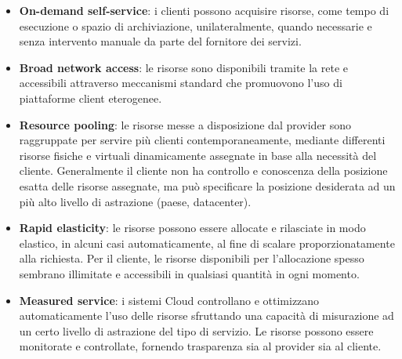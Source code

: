 \documentclass[a4paper]{article}
\begin{document}
\begin{itemize}
    \item{\textbf{On-demand self-service}}: i clienti possono acquisire risorse, come tempo di esecuzione o spazio di archiviazione, unilateralmente, quando necessarie e senza intervento manuale da parte del fornitore dei servizi.
    
    \item{\textbf{Broad network access}}: le risorse sono disponibili tramite la rete e accessibili attraverso meccanismi standard che promuovono l'uso di piattaforme client eterogenee.
    
    \item{\textbf{Resource pooling}}: le risorse messe a disposizione dal provider sono raggruppate per servire più clienti contemporaneamente, mediante differenti risorse fisiche e virtuali dinamicamente assegnate in base alla necessità del cliente. Generalmente il cliente non ha controllo e conoscenza della posizione esatta delle risorse assegnate, ma può specificare la posizione desiderata ad un più alto livello di astrazione (paese, datacenter).
    
    \item{\textbf{Rapid elasticity}}: le risorse possono essere allocate e rilasciate in modo elastico, in alcuni casi automaticamente, al fine di scalare proporzionatamente alla richiesta. Per il cliente, le risorse disponibili per l'allocazione spesso sembrano illimitate e accessibili in qualsiasi quantità in ogni momento.
    
    \item{\textbf{Measured service}}: i sistemi Cloud controllano e ottimizzano automaticamente l'uso delle risorse sfruttando una capacità di misurazione ad un certo livello di astrazione del tipo di servizio. Le risorse possono essere monitorate e controllate, fornendo trasparenza sia al provider sia al cliente.\cite{cloud_computing}
\end{itemize}

\end{document}
